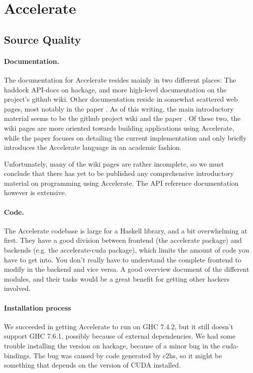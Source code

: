 \section{Accelerate}
\subsection{Source Quality}

\paragraph{Documentation.} The documentation for Accelerate resides mainly in
two different places: The haddock API-docs on hackage, and more high-level
documentation on the project's github wiki.  Other documentation reside in
somewhat scattered web pages, most notably in the paper
\cite{chakravarty2011accelerating}.  As of this writing, the main introductory
material seems to be the github project wiki and the paper
\cite{chakravarty2011accelerating}. Of these two, the wiki pages are more
oriented towards building applications using Accelerate, while the paper
focuses on detailing the current implementation and only briefly introduces the
Accelerate language in an academic fashion.

Unfortunately, many of the wiki pages are rather incomplete, so we must
conclude that there has yet to be published any comprehensive introductory
material on programming using Accelerate.
The API reference documentation however is extensive.

\paragraph{Code.} The Accelerate codebase is large for a Haskell library, and
a bit overwhelming at first. They have a good division between frontend (the
accelerate package) and backends (e.g. the accelerate-cuda package), which
limits the amount of code you have to get into. You don't really have to
understand the complete frontend to modify in the backend and vice versa. A
good overview document of the different modules, and their tasks would be a
great benefit for getting other hackers involved.

\paragraph{Installation process} We succeeded in getting Accelerate to run on
GHC 7.4.2, but it still doesn't support GHC 7.6.1, possibly because of external
dependencies.  We had some trouble installing the version on hackage, because
of a minor bug in the cuda-bindings. The bug was caused by code generated by
c2hs, so it might be something that depends on the version of CUDA installed.

